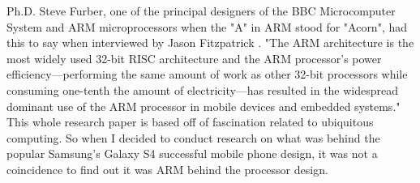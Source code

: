 \documentclass[12pt]{scrreprt}
\begin{document}
	Ph.D. Steve Furber, one of the principal designers of the BBC Microcomputer System and ARM microprocessors when the "A" in ARM stood for 
	"Acorn", had this to say when interviewed by Jason Fitzpatrick \autocite[1]{steveFurber}. "The ARM architecture is the most widely used 32-bit RISC architecture and the ARM processor's power efficiency—performing the same amount of work as other 32-bit processors while consuming one-tenth the amount of electricity—has resulted in the widespread dominant use of the ARM processor in mobile devices and embedded systems." This whole research paper is based off of fascination related to ubiquitous computing. So when I decided to conduct research on what was behind the popular Samsung's Galaxy S4 successful mobile phone design, it was not a coincidence to find out it was ARM behind the processor design.

\printbibliography
\end{document}
